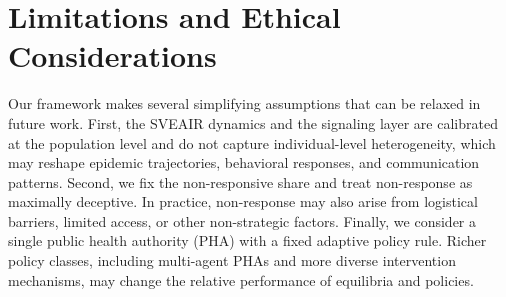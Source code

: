 \documentclass[sigconf,review]{acmart}
\begin{document}







\section*{Limitations and Ethical Considerations}

Our framework makes several simplifying assumptions that can be relaxed in future work. First, the SVEAIR dynamics and the signaling layer are calibrated at the population level and do not capture individual-level heterogeneity, which may reshape epidemic trajectories, behavioral responses, and communication patterns. Second, we fix the non-responsive share and treat non-response as maximally deceptive. In practice, non-response may also arise from logistical barriers, limited access, or other non-strategic factors. Finally, we consider a single public health authority (PHA) with a fixed adaptive policy rule. Richer policy classes, including multi-agent PHAs and more diverse intervention mechanisms, may change the relative performance of equilibria and policies.
\end{document}
